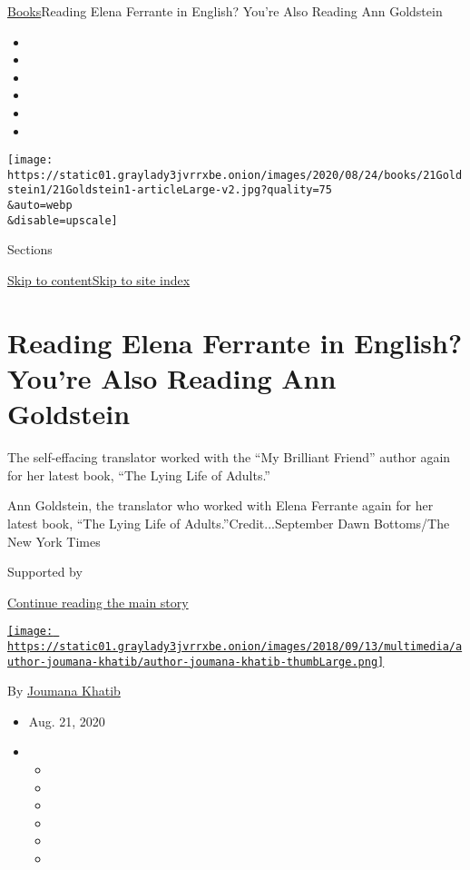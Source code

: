 \href{/section/books}{Books}\textbar{}Reading Elena Ferrante in English?
You're Also Reading Ann Goldstein

\begin{itemize}
\item
\item
\item
\item
\item
\item
\end{itemize}

\texttt{[image: https://static01.graylady3jvrrxbe.onion/images/2020/08/24/books/21Goldstein1/21Goldstein1-articleLarge-v2.jpg?quality=75\\\&auto=webp\\\&disable=upscale]}

Sections

\protect\hyperlink{site-content}{Skip to
content}\protect\hyperlink{site-index}{Skip to site index}

\hypertarget{reading-elena-ferrante-in-english-youre-also-reading-ann-goldstein}{%
\section{Reading Elena Ferrante in English? You're Also Reading Ann
Goldstein}\label{reading-elena-ferrante-in-english-youre-also-reading-ann-goldstein}}

The self-effacing translator worked with the ``My Brilliant Friend''
author again for her latest book, ``The Lying Life of Adults.''

Ann Goldstein, the translator who worked with Elena Ferrante again for
her latest book, ``The Lying Life of Adults.''Credit...September Dawn
Bottoms/The New York Times

Supported by

\protect\hyperlink{after-sponsor}{Continue reading the main story}

\href{https://nytimes3xbfgragh.onion/by/joumana-khatib}{\texttt{[image: https://static01.graylady3jvrrxbe.onion/images/2018/09/13/multimedia/author-joumana-khatib/author-joumana-khatib-thumbLarge.png]}}

By \href{https://nytimes3xbfgragh.onion/by/joumana-khatib}{Joumana
Khatib}

\begin{itemize}
\item
  Aug. 21, 2020
\item
  \begin{itemize}
  \item
  \item
  \item
  \item
  \item
  \item
  \end{itemize}
\end{itemize}

